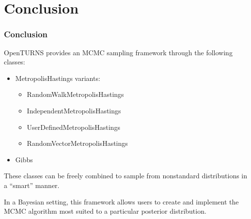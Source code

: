\documentclass{beamer}
\begin{document}
\section{Conclusion}
\begin{frame}
    \frametitle{Conclusion}
    OpenTURNS provides an MCMC sampling framework through the following classes:
    \begin{itemize}
        \item MetropolisHastings variants:
        \begin{itemize}
            \item RandomWalkMetropolisHastings
            \item IndependentMetropolisHastings
            \item UserDefinedMetropolisHastings
            \item RandomVectorMetropolisHastings
        \end{itemize}
        \item Gibbs
    \end{itemize}
    \medskip
    These classes can be freely combined to sample from nonstandard distributions
    in a ``smart'' manner. \medskip

    In a Bayesian setting, this framework allows users to create and implement
    the MCMC algorithm most suited to a particular posterior distribution.
\end{frame}
    
\end{document}
